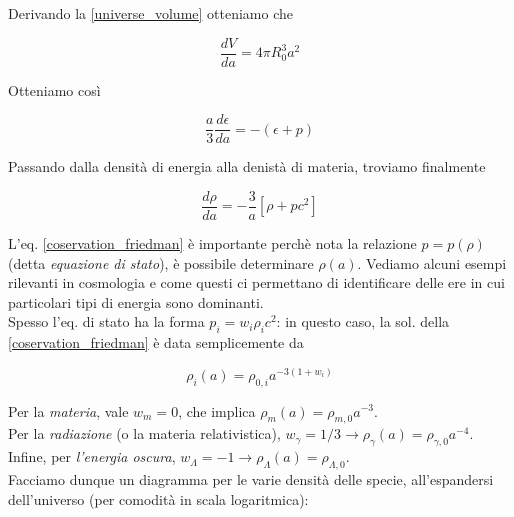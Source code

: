 \documentclass{report}
\begin{document}
Derivando la \ref{universe_volume} otteniamo che

\begin{equation}
    \frac{dV}{da} = 4\pi R_0^3 a^2
\end{equation}

Otteniamo così

\begin{equation}
    \frac{a}{3}\frac{d\epsilon}{da} = -(\epsilon + p)
\end{equation}

Passando dalla densità di energia alla denistà di materia, troviamo finalmente 

\begin{tcolorbox}[colback=gray!15, colframe=black, boxrule=1pt]
\begin{equation}
    \label{coservation_friedman}
    \frac{d\rho}{da} = -\frac{3}{a}\left[\rho +  pc^2\right]
\end{equation}
\end{tcolorbox}

L'eq. \ref{coservation_friedman} è importante perchè nota la relazione $p = p(\rho)$ (detta \emph{equazione di stato}), è possibile determinare $\rho(a)$. Vediamo alcuni esempi rilevanti in cosmologia e come questi ci permettano di identificare delle ere in cui particolari tipi di energia sono dominanti. \\

Spesso l'eq. di stato ha la forma $p_i = w_i\rho_ic^2$: in questo caso, la sol. della \ref{coservation_friedman} è data semplicemente da 

\begin{equation}
    \rho_i(a) = \rho_{0, i}a^{-3(1 + w_i)}
\end{equation}

\vspace{0.5cm}
Per la \emph{materia}, vale $w_m = 0$, che implica $\rho_m(a) = \rho_{m,0}a^{-3}$.  \\

Per la \emph{radiazione} (o la materia relativistica), $w_\gamma = 1/3 \rightarrow \rho_\gamma (a) = \rho_{\gamma , 0}a^{-4}$. \\

Infine, per \emph{l'energia oscura}, $w_\Lambda = -1 \rightarrow \rho_\Lambda(a) = \rho_{\Lambda, 0} $. \\

Facciamo dunque un diagramma per le varie densità delle specie, all'espandersi dell'universo (per comodità in scala logaritmica): \\
\end{document}
